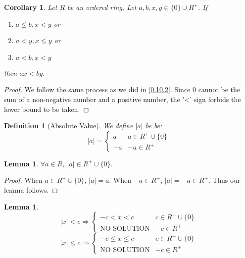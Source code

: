 \documentclass{article}
\newcommand{\less}{<}
\newtheorem{defn}[thm]{Definition}
\newtheorem{cor}[thm]{Corollary}
\newtheorem{lem}[thm]{Lemma}
\begin{document}
\begin{cor}
\label{0.10.6}
Let $R$ be an ordered ring. Let $a,b, x, y \in \{0\} \cup R^+$. If
\begin{enumerate}
    \item $a\leq b, x\less y$ or
    \item $a\less y, x\leq y$ or
    \item $a\less b, x\less y$
\end{enumerate} 
then $ax<by$. 
\end{cor}
\begin{proof}
We follow the same process as we did in \ref{0.10.2}. Since $0$ cannot be the sum of a non-negative number and a positive number, the '<' sign forbids the lower bound to be taken. 
\end{proof}

\begin{defn}[Absolute Value]
\label{abs}
We define $|a|$ be be:
\begin{equation}
    |a|=
    \begin{cases}
    a & a\in R^{+} \cup \{0\}\\
    -a & -a \in R^{+}
    \end{cases}
\end{equation}
\end{defn}

\begin{lem}
\label{abspos}
$\forall a\in R$, $|a|\in R^{+}\cup \{0\}$.
\end{lem}
 \begin{proof}
When $a\in R^{+} \cup \{0\}$, $|a|=a$. When $-a\in R^{+}$, $|a|=-a\in R^{+}$. Thus our lemma follows. 
\end{proof}

\begin{lem}
\begin{equation}
    |x|<c \Rightarrow 
    \begin{cases}
    -c< x< c & c\in R^{+}\cup \{0\}\\
    \text{NO SOLUTION} & -c\in R^{+}
    \end{cases}
\end{equation}
\begin{equation}
    |x|\leq c \Rightarrow 
    \begin{cases}
    -c\leq x\leq c & c\in R^{+}\cup \{0\}\\
    \text{NO SOLUTION} & -c\in R^{+}
    \end{cases}
\end{equation}
\end{lem}
\end{document}
